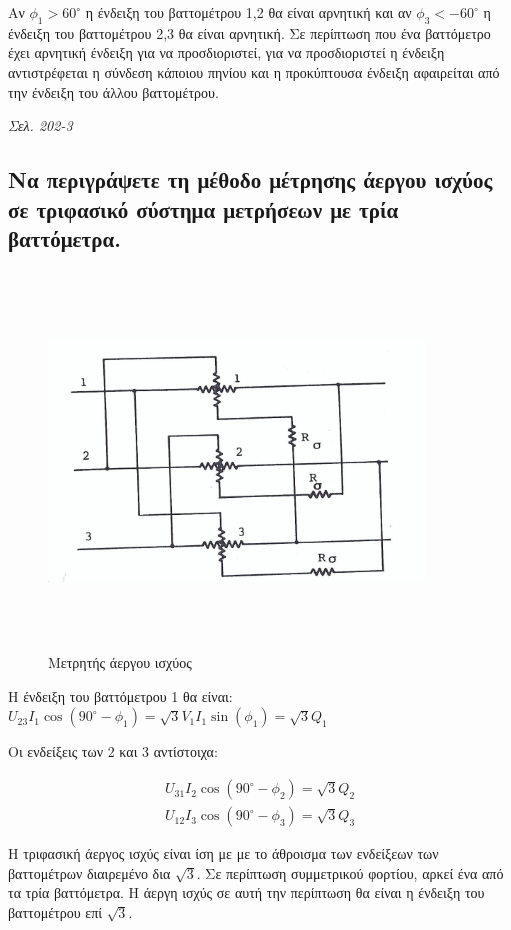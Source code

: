 \documentclass{article}
\begin{document}
Αν $\phi_1 > 60^\circ$ η ένδειξη του βαττομέτρου 1,2 θα είναι αρνητική και αν $\phi_3 < -60^\circ$ η ένδειξη του βαττομέτρου 2,3 θα είναι αρνητική. Σε περίπτωση που ένα
βαττόμετρο έχει αρνητική ένδειξη για να προσδιοριστεί, για να προσδιοριστεί η ένδειξη αντιστρέφεται η σύνδεση κάποιου πηνίου και η προκύπτουσα ένδειξη αφαιρείται από την
ένδειξη του άλλου βαττομέτρου.


\emph{Σελ. 202-3}

\subsection{Να περιγράψετε τη μέθοδο μέτρησης άεργου ισχύος σε τριφασικό σύστημα μετρήσεων με τρία βαττόμετρα.}

\begin{figure}[h!]
    \includegraphics[width=10cm, height=10cm, keepaspectratio]{aei.png}
    \caption{Μετρητής άεργου ισχύος}
    \label{fig:4.3MAI}
\end{figure}

Η ένδειξη του βαττόμετρου 1 θα είναι: $U_{23}I_1\cos(90^\circ - \phi_1) = \sqrt{3}V_1I_1\sin(\phi_1) = \sqrt{3}Q_1$

Οι ενδείξεις των 2 και 3 αντίστοιχα:

\begin{align*}
    U_{31}I_2\cos(90^\circ - \phi_2)=\sqrt3Q_2 \\
    U_{12}I_3\cos(90^\circ - \phi_3)=\sqrt3Q_3
\end{align*}

Η τριφασική άεργος ισχύς είναι ίση με με το άθροισμα των ενδείξεων των βαττομέτρων διαιρεμένο δια $\sqrt{3}$. Σε περίπτωση συμμετρικού φορτίου, αρκεί ένα από τα τρία 
βαττόμετρα. Η άεργη ισχύς σε αυτή την περίπτωση θα είναι η ένδειξη του βαττομέτρου επί $\sqrt{3}$.
\end{document}
